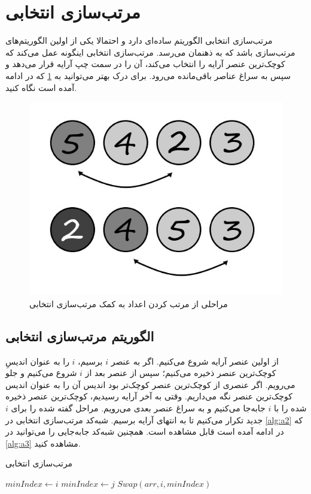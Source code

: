 \documentclass[12pt]{article}
\begin{document}
\section{مرتب‌سازی انتخابی\protect{}}

مرتب‌سازی انتخابی الگوریتم ساده‌ای دارد و
احتمالا یکی از اولین الگوریتم‌های مرتب‌سازی باشد که به ذهنمان می‌رسد.
مرتب‌سازی انتخابی اینگونه عمل می‌کند که کوچک‌ترین عنصر آرایه را انتخاب می‌کند، آن را در سمت چپ آرایه قرار می‌دهد
و سپس به سراغ عناصر باقی‌مانده می‌رود.
\cite{clrs}
برای درک بهتر می‌توانید به
\cref{fig:f2}
که در ادامه آمده است
نگاه کنید.

\begin{figure}[H]
  \centering
  \includegraphics[width=.65\textwidth]{figs/selectionSort.jpg}
  \caption{
    مراحلی از مرتب کردن اعداد به کمک مرتب‌سازی انتخابی
  }
  \label{fig:f2}
\end{figure}

\subsection*{الگوریتم مرتب‌سازی انتخابی}
از اولین عنصر آرایه شروع می‌کنیم. اگر به عنصر
$i$
برسیم،
$i$
را به عنوان اندیسِ
کوچک‌ترین عنصر ذخیره می‌کنیم؛
سپس از عنصر بعد از
$i$
شروع می‌کنیم و جلو می‌رویم.
اگر عنصری از
کوچک‌ترین عنصر
کوچک‌تر بود
اندیس آن را به عنوان اندیس کوچک‌ترین عنصر نگه می‌داریم.
وقتی به آخر آرایه رسیدیم،
کوچک‌ترین عنصر ذخیره شده را با
$i$
جابه‌جا
می‌کنیم
و به سراغ عنصر بعدی می‌رویم.
مراحل گفته شده را برای
$i$
جدید تکرار می‌کنیم
تا به انتهای آرایه برسیم.
شبه‌کد مرتب‌سازی انتخابی در
\cref{alg:a2}
که در ادامه آمده است قابل مشاهده است.
همچنین شبه‌کد جابه‌جایی را می‌توانید در
\cref{alg:a3}
مشاهده کنید.

\begin{algorithm}[H]
  \caption{مرتب‌سازی انتخابی}
  \label{alg:a2}
  \begin{latin}
    \begin{algorithmic}[1]
      \State $minIndex \gets i$
      \State $minIndex \gets j$
      \EndIf
      \EndFor
      \State $Swap(arr, i, minIndex)$
      \EndFor
      \EndProcedure
    \end{algorithmic}
  \end{latin}
\end{algorithm}
\end{document}
